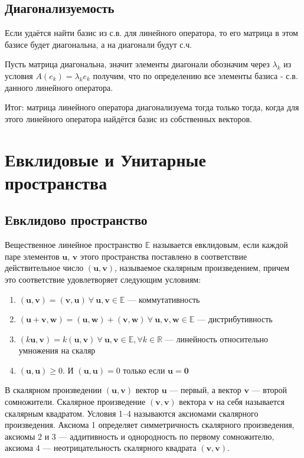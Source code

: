 \documentclass[12pt]{article}
\begin{document}
\subsection{Диагонализуемость}

Если удаётся найти базис из с.в. для линейного оператора, то его матрица в этом базисе будет диагональна, а на диагонали будут с.ч.

Пусть матрица диагональна, значит элементы диагонали обозначим через $\lambda_k$ из условия $A(e_k) = \lambda_k e_k$ получим, что по определению все элементы базиса - с.в. данного линейного оператора.

Итог: матрица линейного оператора диагонализуема тогда только тогда, когда для этого линейного оператора найдётся базис из собственных векторов.

\section{Евклидовые и Унитарные пространства}

\subsection{Евклидово пространство}
Вещественное линейное пространство $\mathbb{E}$ называется евклидовым, если каждой паре элементов $\mathbf{u},\,\mathbf{v}$ этого пространства поставлено в соответствие действительное число $(\mathbf{u},\mathbf{v})$, называемое скалярным произведением, причем это соответствие удовлетворяет следующим условиям:
\begin{enumerate}
    \item $(\mathbf{u},\mathbf{v})=(\mathbf{v},\mathbf{u})\ \forall\ \mathbf{u},\mathbf{v}\in \mathbb{E}$ --- коммутативность

    \item $(\mathbf{u} + \mathbf{v},\mathbf{w})=(\mathbf{u},\mathbf{w})+(\mathbf{v},\mathbf{w})\ \forall\ \mathbf{u},\mathbf{v},\mathbf{w}\in \mathbb{E}$ --- дистрибутивность

    \item $(k\mathbf{u},\mathbf{v})=k(\mathbf{u},\mathbf{v})\ \forall\ \mathbf{u},\mathbf{v}\in \mathbb{E},\forall k\in \mathbb{R}$ --- линейность относительно умножения на скаляр

    \item $(\mathbf{u},\mathbf{u})\geq 0$. И $(\mathbf{u},\mathbf{u})=0$ только если $\mathbf{u}=\mathbf{0}$
\end{enumerate}
В скалярном произведении $(\mathbf{u}, \mathbf{v})$ вектор $\mathbf{u}$ — первый, а вектор $\mathbf{v}$ — второй сомножители. Скалярное произведение $(\mathbf{v},\mathbf{v})$ вектора $\mathbf{v}$ на себя называется скалярным квадратом. Условия 1–4 называются аксиомами скалярного произведения. Аксиома 1 определяет симметричность скалярного произведения, аксиомы 2 и 3 — аддитивность и однородность по первому сомножителю, аксиома 4 — неотрицательность скалярного квадрата $(\mathbf{v}, \mathbf{v})$.
\end{document}
